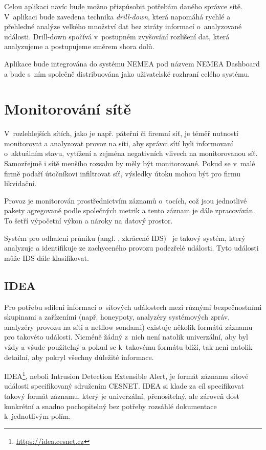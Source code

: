 Celou aplikaci navíc bude možno přizpůsobit potřebám daného správce sítě. V~aplikaci bude zavedena technika {\it drill-down}, která napomáhá rychlé a přehledné analýze velkého množství dat bez ztráty informací o~analyzované události. Drill-down spočívá v~postupném zvyšování rozlišení dat, která analyzujeme a postupujeme směrem shora dolů.

Aplikace bude integrována do systému NEMEA pod názvem NEMEA Dashboard a bude s~ním společně distribuována jako uživatelské rozhraní celého systému.

\chapter{Monitorování sítě}

V~rozlehlejších sítích, jako je např. páteřní či firemní síť, je téměř nutností monitorovat a analyzovat provoz na síti, aby správci sítí byli informovaní o~aktuálním stavu, vytížení a zejména negativních vlivech na monitorovanou síť. Samozřejmě i sítě menšího rozsahu by měly být monitorované. Pokud se v~malé firmě podaří útočníkovi infiltrovat síť, výsledky útoku mohou být pro firmu likvidační.

Provoz je monitorován prostřednictvím záznamů o~tocích, což jsou jednotlivé pakety agregované podle společných metrik a tento záznam je dále zpracováván. To šetří výpočetní výkon a nároky na datový prostor.

Systém pro odhalení průniku (angl. , zkráceně IDS)~\cite{idsips} je takový systém, který analyzuje a identifikuje ze zachyceného provozu podezřelé události. Tyto události může IDS dále klasifikovat. 

\section{IDEA}
\label{sec:idea}

Pro potřebu sdílení informací o~síťových událostech mezi různými bezpečnostními skupinami a zařízeními (např. honeypoty, analyzéry systémových zpráv, analyzéry provozu na síti a netflow sondami) existuje několik formátů záznamu pro takovéto události. Nicméně žádný z~nich není natolik univerzální, aby byl vždy a všude použitelný a pokud se k~takovému formátu blíží, tak není natolik detailní, aby pokryl všechny důležité informace.

IDEA\footnote{\url{https://idea.cesnet.cz}}, neboli Intrusion Detection Extensible Alert, je formát záznamu síťové události specifikovaný sdružením CESNET. IDEA si klade za cíl specifikovat takový formát záznamu, který je univerzální, přenositelný, ale zároveň dost konkrétní a snadno pochopitelný bez potřeby rozsáhlé dokumentace k~jednotlivým polím.

